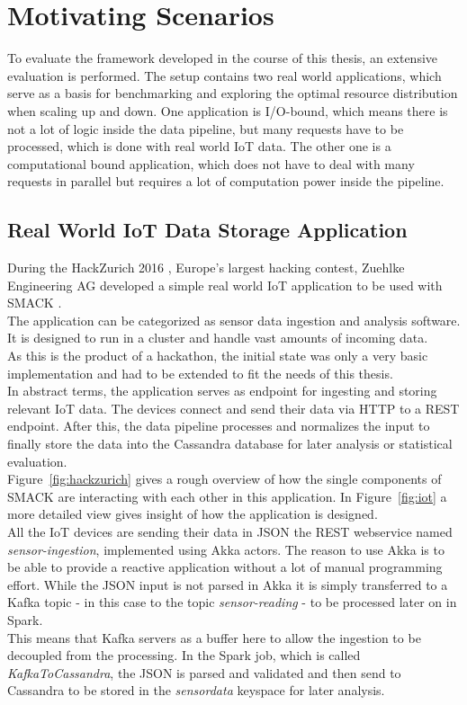 \section{Motivating Scenarios}
To evaluate the framework developed in the course of this thesis, an extensive evaluation is performed.
The setup contains two real world applications, which serve as a basis for benchmarking and exploring the optimal resource distribution when scaling up and down.
One application is I/O-bound, which means there is not a lot of logic inside the data pipeline, but many requests have to be processed, which is done with real world IoT data.
The other one is a computational bound application, which does not have to deal with many requests in parallel but requires a lot of computation power inside the pipeline.

\subsection{Real World IoT Data Storage Application}
\label{sec:iot_application}
During the HackZurich 2016 \cite{hackzurich_website}, Europe's largest hacking contest, Zuehlke Engineering AG \cite{zuehlke} developed a simple real world IoT application to be used with SMACK \cite{hackzurich}.\\
The application can be categorized as sensor data ingestion and analysis software.
It is designed to run in a cluster and handle vast amounts of incoming data.\\
As this is the product of a hackathon, the initial state was only a very basic implementation and had to be extended to fit the needs of this thesis.\\

In abstract terms, the application serves as endpoint for ingesting and storing relevant IoT data.
The devices connect and send their data via HTTP to a REST endpoint.
After this, the data pipeline processes and normalizes the input to finally store the data into the Cassandra database for later analysis or statistical evaluation.\\

Figure~\ref{fig:hackzurich} gives a rough overview of how the single components of SMACK are interacting with each other in this application.
In Figure~\ref{fig:iot} a more detailed view gives insight of how the application is designed.\\
All the IoT devices are sending their data in JSON the REST webservice named \textit{sensor-ingestion}, implemented using Akka actors.
The reason to use Akka is to be able to provide a reactive application without a lot of manual programming effort.
While the JSON input is not parsed in Akka it is simply transferred to a Kafka topic - in this case to the topic \textit{sensor-reading} - to be processed later on in Spark.\\
This means that Kafka servers as a buffer here to allow the ingestion to be decoupled from the processing.
In the Spark job, which is called \textit{KafkaToCassandra}, the JSON is parsed and validated and then send to Cassandra to be stored in the \textit{sensordata} keyspace for later analysis.\\

